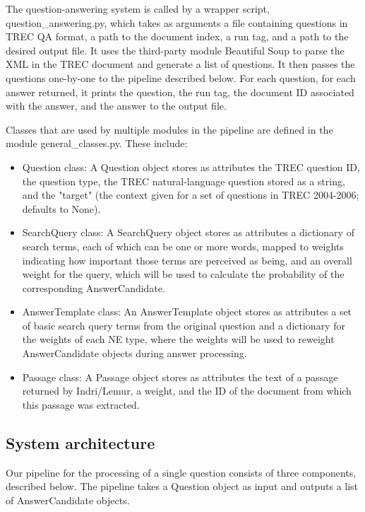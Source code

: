 \documentclass[11pt]{article}
\begin{document}
The question-answering system is called by a wrapper script, question\_answering.py, which takes as arguments a file containing questions in TREC QA format, a path to the document index, a run tag, and a path to the desired output file. It uses the third-party module Beautiful Soup to parse the XML in the TREC document and generate a list of questions. It then passes the questions one-by-one to the pipeline described below. For each question, for each answer returned, it prints the question, the run tag, the document ID associated with the answer, and the answer to the output file.

Classes that are used by multiple modules in the pipeline are defined in the module general\_classes.py. These include:

\begin{itemize}
\item Question class: A Question object stores as attributes the TREC question ID, the question type, the TREC natural-language question stored as a string, and the "target" (the context given for a set of questions in TREC 2004-2006; defaults to None).
\item SearchQuery class: A SearchQuery object stores as attributes a dictionary of search terms, each of which can be one or more words, mapped to weights indicating how important those terms are perceived as being, and an overall weight for the query, which will be used to calculate the probability of the corresponding AnswerCandidate.
\item AnswerTemplate class: An AnswerTemplate object stores as attributes a set of basic search query terms from the original question and a dictionary for the weights of each NE type, where the weights will be used to reweight AnswerCandidate objects during answer processing.
\item Passage class: A Passage object stores as attributes the text of a passage returned by Indri/Lemur, a weight, and the ID of the document from which this passage was extracted.
\end{itemize}

\subsection{System architecture}

Our pipeline for the processing of a single question consists of three components, described below. The pipeline takes a Question object as input and outputs a list of AnswerCandidate objects.
\end{document}
